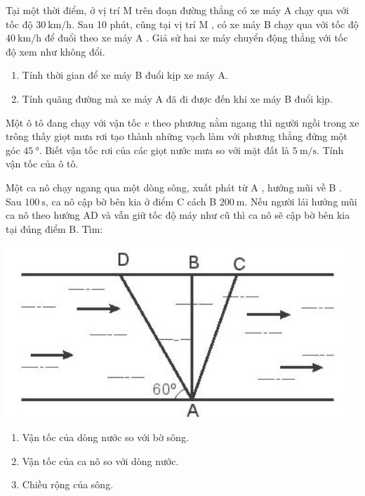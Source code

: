\begin{ex}
	Tại một thời điểm, ở vị trí M trên đoạn đường thẳng có xe máy A chạy qua với tốc độ $\SI{30}{\kilo\meter/\hour}$. Sau 10 phút, cũng tại vị trí M , có xe máy B chạy qua với tốc độ $\SI{40}{\kilo\meter/\hour}$ để đuổi theo xe máy A . Giả sử hai xe máy chuyển động thẳng với tốc độ xem như không đổi.
	\begin{enumerate}[label=\alph*)]
		\item Tính thời gian để xe máy B đuổi kịp xe máy A.
		\item Tính quãng đường mà xe máy A đã đi được đến khi xe máy B đuổi kịp.
	\end{enumerate}
\end{ex}
\begin{ex}
	Một ô tô đang chạy với vận tốc $v$ theo phương nằm ngang thì người ngồi trong xe trông thấy giọt mưa rơi tạo thành những vạch làm với phương thẳng đứng một góc $\SI{45}{\degree}$. Biết vận tốc rơi của các giọt nước mưa so với mặt đất là $\SI{5}{\meter/\second}$. Tính vận tốc của ô tô.
\end{ex}
\begin{ex}
	Một ca nô chạy ngang qua một dòng sông, xuất phát từ A , hướng mũi về B . Sau $\SI{100}{\second}$, ca nô cập bờ bên kia ở điểm C cách B $\SI{200}{\meter}$. Nếu người lái hướng mũi ca nô theo hướng AD và vẫn giữ tốc độ máy như cũ thì ca nô sẽ cập bờ bên kia tại đúng điểm B. Tìm:
	\begin{center}
		\includegraphics[width=0.35\linewidth]{figs/BAI5-2}
	\end{center}
	\begin{enumerate}[label=\alph*)]
		\item Vận tốc của dòng nước so với bờ sông.
		\item Vận tốc của ca nô so với dòng nước.
		\item Chiều rộng của sông.
	\end{enumerate}
\end{ex}
